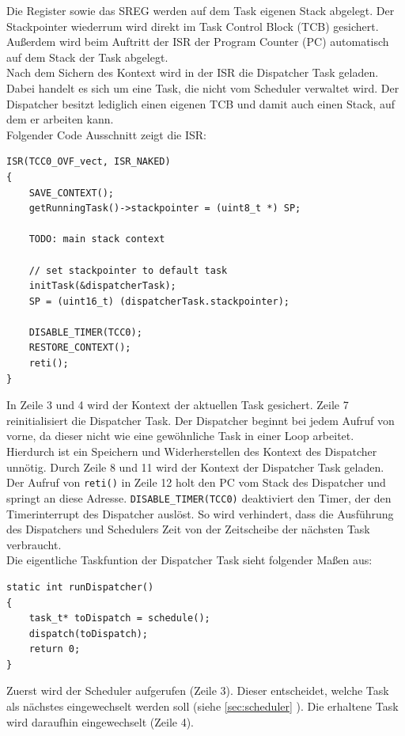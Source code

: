 \documentclass[fontsize=12pt, toc=bibliography, notitlepage]{scrreprt}
\newcommand{\refnn}[1]{\ref{#1} \nameref{#1}}
\begin{document}
Die Register sowie das SREG werden auf dem Task eigenen Stack abgelegt. Der Stackpointer wiederrum wird direkt im Task Control Block (TCB) gesichert. Außerdem wird beim Auftritt der ISR der Program Counter (PC) automatisch auf dem Stack der Task abgelegt.\\
Nach dem Sichern des Kontext wird in der ISR die Dispatcher Task geladen. Dabei handelt es sich um eine Task, die nicht vom Scheduler verwaltet wird. Der Dispatcher besitzt lediglich einen eigenen TCB und damit auch einen Stack, auf dem er arbeiten kann.\\

Folgender Code Ausschnitt zeigt die ISR:

\begin{lstlisting}[title=dispatcher.c]
ISR(TCC0_OVF_vect, ISR_NAKED)
{
	SAVE_CONTEXT();
	getRunningTask()->stackpointer = (uint8_t *) SP;
	
	TODO: main stack context
	
	// set stackpointer to default task
	initTask(&dispatcherTask);
	SP = (uint16_t) (dispatcherTask.stackpointer);
	
	DISABLE_TIMER(TCC0);
	RESTORE_CONTEXT();
	reti();
}
\end{lstlisting}

In Zeile 3 und 4 wird der Kontext der aktuellen Task gesichert. Zeile 7 reinitialisiert die Dispatcher Task. Der Dispatcher beginnt bei jedem Aufruf von vorne, da dieser nicht wie eine gewöhnliche Task in einer Loop arbeitet. Hierdurch ist ein Speichern und Widerherstellen des Kontext des Dispatcher unnötig. Durch Zeile  8 und 11 wird der Kontext der Dispatcher Task geladen. Der Aufruf von \lstinline$reti()$ in Zeile 12 holt den PC vom Stack des Dispatcher und springt an diese Adresse. \lstinline$DISABLE_TIMER(TCC0)$ deaktiviert den Timer, der den Timerinterrupt des Dispatcher auslöst. So wird verhindert, dass die Ausführung des Dispatchers und Schedulers Zeit von der Zeitscheibe der nächsten Task verbraucht.\\

Die eigentliche Taskfuntion der Dispatcher Task sieht folgender Maßen aus:

\begin{lstlisting}[title=dispatcher.c]
static int runDispatcher()
{
	task_t* toDispatch = schedule();
	dispatch(toDispatch);
	return 0;
}
\end{lstlisting}

Zuerst wird der Scheduler aufgerufen (Zeile 3). Dieser entscheidet, welche Task als nächstes eingewechselt werden soll (siehe \refnn{sec:scheduler}). Die erhaltene Task wird daraufhin eingewechselt (Zeile 4).\\
\end{document}

